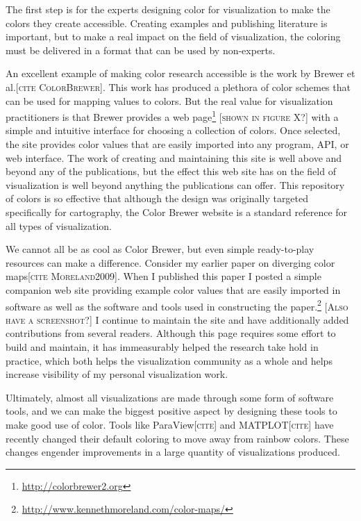 \documentclass[letterpaper,twocolumn,fleqn]{article}
\newcommand{\etal}{et al.\xspace}
\newcommand{\fix}[1]{{\color{red}\textsc{[#1]}}}
\begin{document}
The first step is for the experts designing color for visualization to make
the colors they create accessible. Creating examples and publishing
literature is important, but to make a real impact on the field of
visualization, the coloring must be delivered in a format that can be used
by non-experts.

An excellent example of making color research accessible is the work by
Brewer \etal\fix{cite ColorBrewer}. This work has produced a plethora of
color schemes that can be used for mapping values to colors. But the real
value for visualization practitioners is that Brewer provides a web
page\footnote{\url{http://colorbrewer2.org}} \fix{shown in figure X?} with
a simple and intuitive interface for choosing a collection of colors. Once
selected, the site provides color values that are easily imported into any
program, API, or web interface. The work of creating and maintaining this
site is well above and beyond any of the publications, but the effect this
web site has on the field of visualization is well beyond anything the
publications can offer. This repository of colors is so effective that
although the design was originally targeted specifically for cartography,
the Color Brewer website is a standard reference for all types of
visualization.

We cannot all be as cool as Color Brewer, but even simple ready-to-play
resources can make a difference. Consider my earlier paper on diverging
color maps\fix{cite Moreland2009}. When I published this paper I posted a
simple companion web site providing example color values that are easily
imported in software as well as the software and tools used in constructing
the paper.\footnote{\url{http://www.kennethmoreland.com/color-maps/}}
\fix{Also have a screenshot?} I continue to maintain the site and have
additionally added contributions from several readers. Although this page
requires some effort to build and maintain, it has immeasurably helped the
research take hold in practice, which both helps the visualization
community as a whole and helps increase visibility of my personal
visualization work.

Ultimately, almost all visualizations are made through some form of
software tools, and we can make the biggest positive aspect by designing
these tools to make good use of color. Tools like ParaView\fix{cite} and
MATPLOT\fix{cite} have recently changed their default coloring to move away
from rainbow colors. These changes engender improvements in a large
quantity of visualizations produced.
\end{document}
